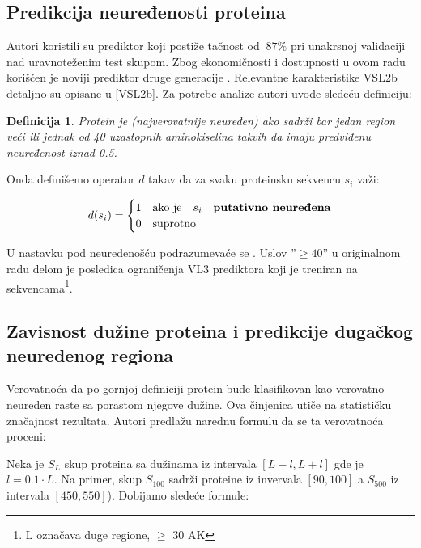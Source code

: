 \subsection{Predikcija neuređenosti proteina}
\label{naredno}

Autori \parencite{Xie2007} koristili su  prediktor koji
postiže tačnost od $~87\%$ pri unakrsnoj validaciji nad uravnoteženim test
skupom.  Zbog ekonomičnosti i dostupnosti u ovom radu korišćen je noviji
prediktor druge generacije .
Relevantne karakteristike VSL2b detaljno su opisane u \ref{VSL2b}.
Za potrebe analize autori \parencite{Xie2007} uvode sledeću definiciju:

\newtheorem{mydef}{Definicija}
\begin{mydef}
\label{pdis_def}
Protein je (najverovatnije neuređen) 
ako sadrži bar jedan region veći ili jednak od 40 uzastopnih aminokiselina
takvih da imaju \textit{predviđenu neuređenost} iznad 0.5. 
\end{mydef}

Onda definišemo operator $d$ takav da za svaku proteinsku sekvencu $s_i$ važi:

\[   
  d(s_i) = 
    \begin{cases}
      1 & \text{ako je} \quad s_i \quad \textbf{putativno neuređena}\\
      0 & \text{suprotno}
    \end{cases}
\]

U nastavku pod neuređenošću podrazumevaće se .
Uslov ''$\ge40$'' u originalnom radu delom je posledica ograničenja VL3
prediktora koji je treniran na  sekvencama\footnote{L označava
duge regione, $\ge$ 30 AK}.

\subsection{Zavisnost dužine proteina i predikcije dugačkog neuređenog regiona}

Verovatnoća da po gornjoj definiciji protein bude klasifikovan kao verovatno
neuređen raste sa porastom njegove dužine. Ova činjenica  utiče
na statističku značajnost rezultata. Autori \parencite{Xie2007} 
predlažu narednu formulu da se ta verovatnoća proceni:

Neka je $S_L$ skup proteina sa dužinama iz intervala $[L-l, L+l]$ gde je $l
= 0.1 \cdot L$. Na primer, skup $S_{100}$ sadrži proteine iz invervala $[90, 100]$ a $S_{500}$ iz intervala $[450, 550]$).
Dobijamo sledeće formule:

